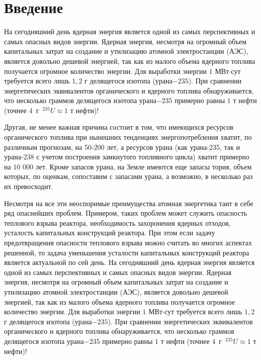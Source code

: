 \chapter*{Введение}							%

На сегодняшний день ядерная энергия является одной из самых перспективных и самых опасных видов энергии.
Ядерная энергия, несмотря на огромный объем капитальных затрат на создание и утилизацию атомной электростанции (АЭС), является довольно дешевой энергией, так как из малого объема ядерного топлива получается огромное количество энергии.
Для выработки энергии $1$ МВт$\cdot$сут требуется всего лишь $1,2$ г делящегося изотопа (урана$-235$).
При сравнении энергетических эквивалентов органического и ядерного топлива обнаруживается, что несколько граммов делящегося изотопа урана$-235$ примерно равны $1$ т нефти (точнее $4$~г~$^{235}U\approx 1$ т нефти)!

Другая, не менее важная причина состоит в том, что имеющихся ресурсов органического топлива при нынешних тенденциях энергопотребления хватит, по различным прогнозам, на 50-200 лет, а ресурсов урана (как урана-235, так и урана-238 с учетом построения замкнутого топливного цикла) хватит примерно на 10 000 лет. Кроме запасов урана, на Земле имеются еще запасы тория, объем которых, по оценкам, сопоставим с запасами урана, а возможно, в несколько раз их превосходит.\cite{Ukr}

Несмотря на все эти неоспоримые преимущества атомная энергетика таит в себе ряд опаснейших проблем.
Примером, таких проблем может служить опасность теплового взрыва реактора, необходимость захоронения ядерных отходов, усталость капитальных конструкций реактора.
При этом если задачу предотвращения опасности теплового взрыва можно считать во многих аспектах решенной, то задача уменьшения усталости капитальных конструкций реактора является актуальной по сей день. На сегодняшний день ядерная энергия является одной из самых перспективных и самых опасных видов энергии.
Ядерная энергия, несмотря на огромный объем капитальных затрат на создание и утилизацию атомной электростанции (АЭС), является довольно дешевой энергией, так как из малого объема ядерного топлива получается огромное количество энергии.
Для выработки энергии $1$ МВт$\cdot$сут требуется всего лишь $1,2$ г делящегося изотопа (урана$-235$).
При сравнении энергетических эквивалентов органического и ядерного топлива обнаруживается, что несколько граммов делящегося изотопа урана$-235$ примерно равны $1$ т нефти (точнее $4$~г~$^{235}U\approx 1$ т нефти)!

